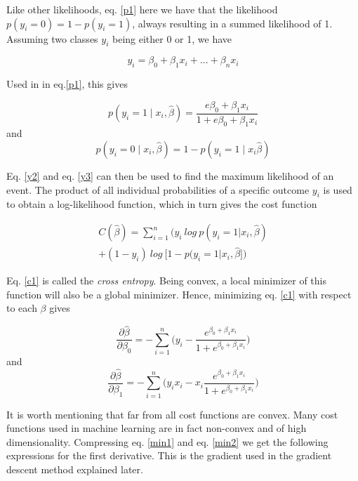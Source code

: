 \documentclass[a4paper,11pt,twocolumn]{article}
\begin{document}
Like other likelihoods,  eq. \eqref{p1} here we have that the likelihood  $p(y_i = 0) = 1-p(y_i = 1) $, always resulting in a summed likelihood of 1. Assuming two classes $y_i$  being either 0 or 1, we have

\begin{equation}
\label{y1}
y_i=\beta_0+\beta_1x_i+...+\beta_nx_i
\end{equation}

Used in in eq.\eqref{p1}, this gives 

\begin{equation}
\label{y2}
p(y_i=1\mid x_i,\hat{\beta}) = \frac{e{\beta_0+\beta_1x_i}}{1+e{\beta_0+\beta_1x_i}}
\end{equation}
and 
\begin{equation}
\label{y3}
p(y_i=0\mid x_i,\hat{\beta}) = 1 - p(y_i=1\mid x_i\hat{\beta})
\end{equation}

Eq. \eqref{y2} and eq. \eqref{y3} can then be used to find the maximum likelihood of an event. The product of all individual probabilities of a specific outcome $y_i$ is used to obtain a log-likelihood function, which in turn gives the cost function 

\begin{equation}
\begin{multlined}
C(\hat{\beta})=\sum\limits_{i=1}^{n}\big(y_i\: log\: p(y_i=1\vert x_i,\hat{\beta})\\ 
+(1-y_i)\:log\: \big[1-p(y_i=1\vert x_i,\hat{\beta}\big]\big)
\end{multlined}
\label{c1}
\end{equation}

Eq. \eqref{c1} is called the \textit{cross entropy}. Being convex, a local minimizer of this function will also be a global minimizer. Hence, minimizing eq. \eqref{c1} with respect to each $\beta$ gives 


\begin{equation}
\frac{\partial\hat{\beta}}{\partial\beta_0}=
-\sum\limits_{i=1}^n\big(y_i-\frac{e^{\beta_0+\beta_1x_i}}{1+e^{\beta_0+\beta_1x_i}}\big)
\label{min1}
\end{equation}
and 
\begin{equation}
\frac{\partial\hat{\beta}}{\partial\beta_1}=
-\sum\limits_{i=1}^n\big(y_ix_i-x_i\frac{e^{\beta_0+\beta_1x_i}}{1+e^{\beta_0+\beta_1x_i}}\big)
\label{min2}
\end{equation}

It is worth mentioning that far from all cost functions are convex. Many cost functions used in machine learning are in fact non-convex and of high dimensionality. Compressing eq. \eqref{min1} and eq. \eqref{min2} we get the following expressions for the first derivative. This is the gradient used in the gradient descent method explained later.
\end{document}
